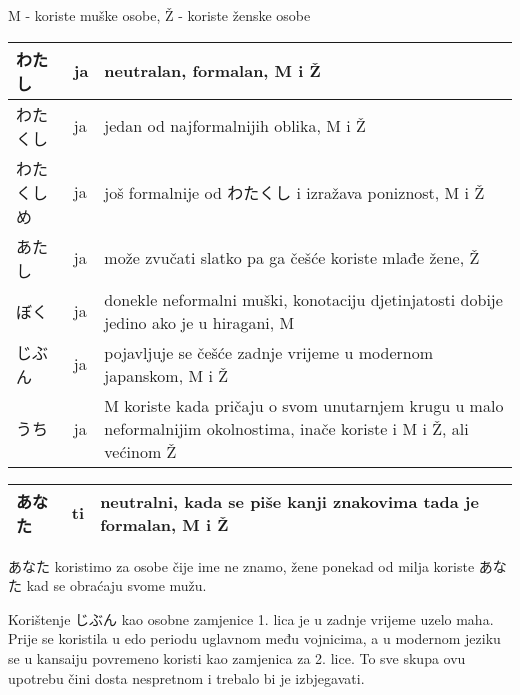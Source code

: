 
\author{Tomislav Mamić, Željka Ludošan}

	
		
	M - koriste muške osobe, Ž - koriste ženske osobe
	
	
	\begin{tabular}{|l|l|p{400pt}|}
		\hline
		わたし&ja&neutralan, formalan, M i Ž\\\hline
		わたくし&ja&jedan od najformalnijih oblika, M i Ž\\\hline
		わたくしめ&ja&još formalnije od わたくし i izražava poniznost, M i Ž\\\hline
		あたし&ja&može zvučati slatko pa ga češće koriste mlađe žene, Ž\\\hline
		ぼく&ja&donekle neformalni muški, konotaciju djetinjatosti dobije jedino ako je u hiragani, M\\\hline
		じぶん&ja&pojavljuje se češće zadnje vrijeme u modernom japanskom, M i Ž\\\hline
		うち&ja&M koriste kada pričaju o svom unutarnjem krugu u malo neformalnijim okolnostima, inače koriste i M i Ž, ali većinom Ž\\\hline
	\end{tabular}
	
	\vspace{10pt}
	
		\begin{tabular}{|l|l|l|}
		\hline
		あなた&ti&neutralni, kada se piše kanji znakovima tada je formalan, M i Ž\\\hline
		\end{tabular}
		
		
	\vspace{10pt}
	
	あなた koristimo za osobe čije ime ne znamo, žene ponekad od milja koriste あなた kad se obraćaju svome mužu.
	
	Korištenje じぶん kao osobne zamjenice 1. lica je u zadnje vrijeme uzelo maha. Prije se koristila u edo periodu uglavnom među vojnicima, a u modernom jeziku se u kansaiju povremeno koristi kao zamjenica za 2. lice. To sve skupa ovu upotrebu čini dosta nespretnom i trebalo bi je izbjegavati.
	
	\vspace{10pt}
	
